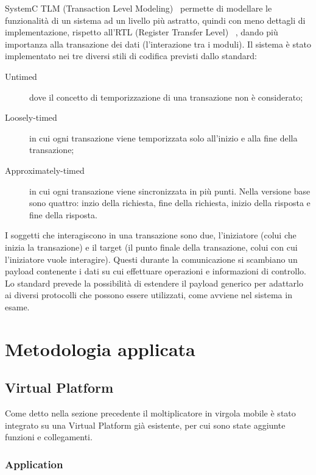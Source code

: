 \documentclass[]{IEEEtran}
\begin{document}
	SystemC TLM (Transaction Level Modeling)~\cite{SystemC-TLM} permette di modellare le funzionalit\`a di un sistema ad un livello pi\`u astratto, quindi con meno dettagli di implementazione, rispetto all'RTL (Register Transfer Level) ~\cite{RTL}, dando pi\`u importanza alla transazione dei dati (l'interazione tra i moduli).
	Il sistema \`e stato implementato nei tre diversi stili di codifica previsti dallo standard:
	\begin{description}
		\item[Untimed] dove il concetto di temporizzazione di una transazione non \`e considerato;
		\item[Loosely-timed] in cui ogni transazione viene temporizzata solo all'inizio e alla fine della transazione;
		\item[Approximately-timed] in cui ogni transazione viene sincronizzata in pi\`u punti. Nella versione base sono quattro: inzio della richiesta, fine della richiesta, inizio della risposta e fine della risposta.
	\end{description}

	I soggetti che interagiscono in una transazione sono due, l'iniziatore (colui che inizia la transazione) e il target (il punto finale della transazione, colui con cui l'iniziatore vuole interagire). Questi durante la comunicazione si scambiano un payload contenente i dati su cui effettuare operazioni e informazioni di controllo. Lo standard prevede la possibilit\`a di estendere il payload generico per adattarlo ai diversi protocolli che possono essere utilizzati, come avviene nel sistema in esame.
	
	\section{Metodologia applicata}

	\subsection{Virtual Platform}
	
	Come detto nella sezione precedente il moltiplicatore in virgola mobile \`e stato integrato su una Virtual Platform gi\`a esistente, per cui sono state aggiunte funzioni e collegamenti.

	\subsubsection{Application}
	
\end{document}
